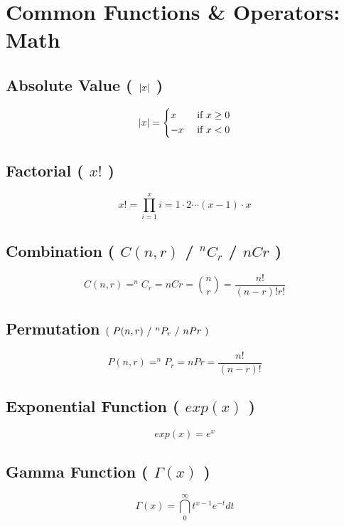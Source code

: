 \chapter{Common Functions \& Operators: Math}



\section{Absolute Value ( $\left| x \right|$ )}\label{abs_value}
\[
    \left|  x  \right| = \begin{dcases}
       x & \text{ if } x \geq 0 \\
       -x & \text{ if } x < 0 
    \end{dcases}
\]


\section{Factorial ( $x!$ )}\label{Factorial}
\[
    x! = \prod_{i=1}^{x} i = 1 \cdot 2 \cdots (x-1) \cdot x 
\]

\section{Combination ( $C(n,r)$ / $^nC_r$ / $nCr$ ) } \label{Combination}

\[
    C(n,r) = ^nC_r = nCr = \displaystyle\binom{n}{r} = \displaystyle\dfrac{n!}{(n-r)!r!}
\]

\section{Permutation \( \dParenBrac{\ P(n,r)\ /\ ^nP_r\ /\ nPr\ } \)} \label{Permutation}

\[
    P(n,r) = ^nP_r = nPr = \displaystyle\dfrac{n!}{(n-r)!}
\]

\section{Exponential Function ( $exp(x)$ )}\label{Exponential Function}

\[
    exp(x) = e^x
\]

\section{Gamma Function ( $\Gamma(x)$ )}\label{Gamma Function}

\[
    \Gamma(x) = \dint_{0}^{\infty} t^{x-1} e^{-t} dt
\]


